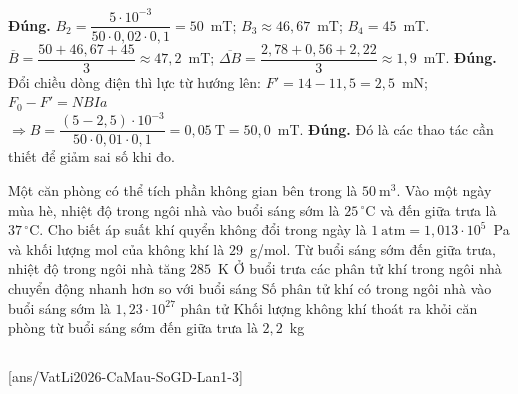 \begin{ex}
{\begin{itemchoice}
				\itemch \textbf{Đúng.} $B_2=\dfrac{5\cdot 10^{-3}}{50\cdot 0{,}02\cdot 0{,}1}=50$~mT; $B_3\approx 46{,}67$~mT; $B_4=45$~mT.\\
				$\overline{B}=\dfrac{50+46{,}67+45}{3}\approx 47{,}2$~mT; $\overline{\Delta B}=\dfrac{2{,}78+0{,}56+2{,}22}{3}\approx 1{,}9$~mT.
				\itemch \textbf{Đúng.} Đổi chiều dòng điện thì lực từ hướng lên: $F'=14-11{,}5=2{,}5$~mN; $F_0-F'=NBIa$\\
				$\Rightarrow B=\dfrac{(5-2{,}5)\cdot 10^{-3}}{50\cdot 0{,}01\cdot 0{,}1}=0{,}05~\text{T}=50{,}0$~mT.
				\itemch \textbf{Đúng.} Đó là các thao tác cần thiết để giảm sai số khi đo.
			\end{itemchoice}
		}
	\end{ex}

	\begin{ex}%
		Một căn phòng có thể tích phần không gian bên trong là $50~\text{m}^3$. Vào một ngày mùa hè, nhiệt độ trong ngôi nhà vào buổi sáng sớm là $25\,^\circ\text{C}$ và đến giữa trưa là $37\,^\circ\text{C}$. Cho biết áp suất khí quyển không đổi trong ngày là $1~\text{atm}=1{,}013\cdot 10^5$~Pa và khối lượng mol của không khí là $29$~g/mol.
		\choiceTFt
		{Từ buổi sáng sớm đến giữa trưa, nhiệt độ trong ngôi nhà tăng $285$~K}
		{\True Ở buổi trưa các phân tử khí trong ngôi nhà chuyển động nhanh hơn so với buổi sáng}
		{\True Số phân tử khí có trong ngôi nhà vào buổi sáng sớm là $1{,}23\cdot 10^{27}$ phân tử}
		{Khối lượng không khí thoát ra khỏi căn phòng từ buổi sáng sớm đến giữa trưa là $2{,}2$~kg}
	\end{ex}

	\subsection*{}
	\setcounter{ex}{0}
	[ans/VatLi2026-CaMau-SoGD-Lan1-3]

